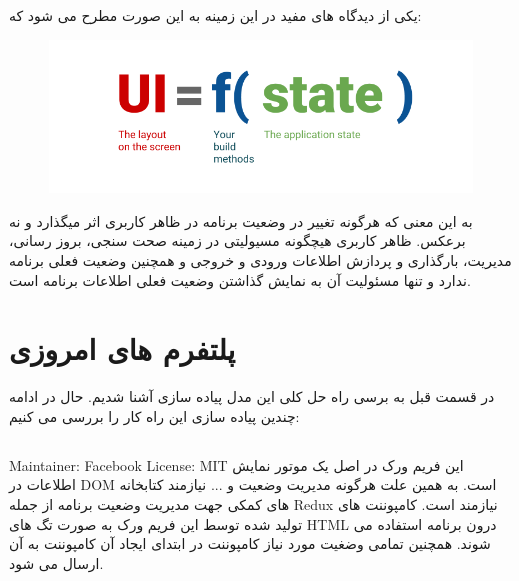 \documentclass{CSICC2020}
\begin{document}
یکی از دیدگاه های مفید در این زمینه به این صورت مطرح می شود که:

\begin{figure}[h!]
\centering\includegraphics[width=\linewidth]{Images/ui_function}
\caption{}
\label{fig:UI_Func}
\end{figure}

به این معنی که هرگونه تغییر در وضعیت برنامه در ظاهر کاربری اثر میگذارد و نه برعکس.
ظاهر کاربری هیچگونه مسیولیتی در زمینه صحت سنجی، بروز رسانی، مدیریت، بارگذاری و پردازش اطلاعات ورودی و خروجی و همچنین وضعیت فعلی برنامه ندارد و تنها مسئولیت آن به نمایش گذاشتن وضعیت فعلی اطلاعات برنامه است.

\section{پلتفرم های امروزی}
در قسمت قبل به برسی راه حل کلی این مدل پیاده سازی آشنا شدیم. حال در ادامه چندین پیاده سازی این راه کار را بررسی می کنیم:

\subsection{}
Maintainer: Facebook
License: MIT
این فریم ورک در اصل یک موتور نمایش اطلاعات در DOM است. به همین علت هرگونه مدیریت وضعیت و ... نیازمند کتابخانه های کمکی جهت مدیریت وضعیت برنامه از جمله Redux نیازمند است.
کامپوننت های تولید شده توسط این فریم ورک به صورت تگ های HTML درون برنامه استفاده می شوند. همچنین تمامی وضغیت مورد نیاز کامپوننت در ابتدای ایجاد آن کامپوننت به آن ارسال می شود.
\end{document}
